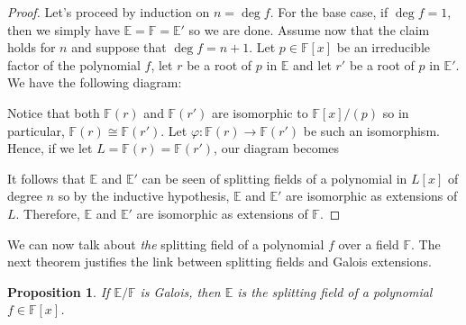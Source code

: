 \documentclass{article}
\newtheorem*{proposition}{Proposition}
\newcommand{\F}{\mathbb{F}}
\newcommand{\E}{\mathbb{E}}
\newcommand{\isomorphic}{\cong}
\begin{document}
\begin{proof}
    Let's proceed by induction on $n = \deg f$. For the base case, if $\deg f = 1$, then we simply have $\E = \F = \E'$ so we are done. Assume now that the claim holds for $n$ and suppose that $\deg f = n+1$. Let $p \in \F[x]$ be an irreducible factor of the polynomial $f$, let $r$ be a root of $p$ in $\E$ and let $r'$ be a root of $p$ in $\E'$. We have the following diagram:
    \begin{center}
    \end{center}
    Notice that both $\F(r)$ and $\F(r')$ are isomorphic to $\F[x]/(p)$ so in particular, $\F(r) \isomorphic \F(r')$. Let $\varphi : \F(r) \to \F(r')$ be such an isomorphism. Hence, if we let $L = \F(r) = \F(r')$, our diagram becomes
    \begin{center}
    \end{center}
    It follows that $\E$ and $\E'$ can be seen of splitting fields of a polynomial in $L[x]$ of degree $n$ so by the inductive hypothesis, $\E$ and $\E'$ are isomorphic as extensions of $L$. Therefore, $\E$ and $\E'$ are isomorphic as extensions of $\F$. 
\end{proof}

We can now talk about \textit{the} splitting field of a polynomial $f$ over a field $\F$. The next theorem justifies the link between splitting fields and Galois extensions. 

\begin{proposition}
    If $\E / \F$ is Galois, then $\E$ is the splitting field of a polynomial $f \in \F[x]$.
\end{proposition}
\end{document}
